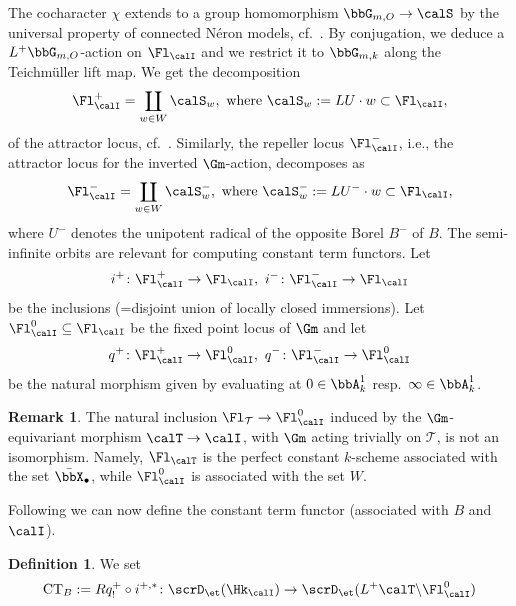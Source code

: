 \documentclass[10pt, reqno]{amsart}
\theoremstyle{plain}
\theoremstyle{definition}
\newtheorem{definition}[theorem]{Definition}
\newtheorem{remark}[theorem]{Remark}
\numberwithin{equation}{section}
\begin{document}
	The cocharacter $\chi$ extends to a group homomorphism $\bbG_{m,O} \to \calS$ by the universal property of connected Néron models, cf.\ \cite[Proposition 8.4]{KP23}. By conjugation, we deduce a $L^+\bbG_{m,O}$-action on $\Fl_{\calI}$ and we restrict it to $\bbG_{m,k}$ along the Teichmüller lift map. We get the decomposition
	\begin{equation}
		\Fl_{\calI}^+=\coprod\limits_{w\in W} \calS_w,\text{ where } \calS_w:=LU\cdot w\subset \Fl_{\calI},
	\end{equation}
	of the attractor locus, cf.\ \cite[Section 5]{AGLR22}. Similarly, the repeller locus $\Fl_{\calI}^-$, i.e., the attractor locus for the inverted $\Gm$-action, decomposes as
	\begin{equation}\label{equation_repellers}
		\Fl_{\calI}^-=\coprod\limits_{w\in W} \calS^-_w,\text{ where } \calS^-_w:=LU^-\cdot w\subset \Fl_{\calI},
	\end{equation}
	where $U^-$ denotes the unipotent radical of the opposite Borel $B^-$ of $B$. The semi-infinite orbits are relevant for computing constant term functors.
	Let
	\begin{equation}
		i^+\colon \Fl_{\calI}^+\to \Fl_{\calI},\ i^-\colon \Fl_{\calI}^-\to \Fl_{\calI}
	\end{equation}
	be the inclusions (=disjoint union of  locally closed immersions).
	Let $\Fl_{\calI}^0\subseteq \Fl_{\calI}$ be the fixed point locus of $\Gm$ and let
	\begin{equation}
		q^+\colon \Fl_{\calI}^+\to \Fl_{\calI}^0,\ q^-\colon \Fl_{\calI}^-\to \Fl_{\calI}^0
	\end{equation}
	be the natural morphism given by evaluating at $0\in \bbA^1_{k}$ resp.\ $\infty\in \bbA^1_{k}$.
	
	\begin{remark}
		\label{sec:constant-terms-semi-fixed-point-locus-not-equal-to-affine-flag-variety-for-levi}
		The natural inclusion $\Fl_{\mathcal{T}}\to \Fl_{\calI}^0$ induced by the $\Gm$-equivariant morphism $\calT\to \calI$, with $\Gm$ acting trivially on $\mathcal{T}$, is not an isomorphism. Namely, $\Fl_{\calT}$ is the perfect constant $k$-scheme associated with the set $\bar{\bbX}_\bullet$, while $\Fl_{\calI}^0$ is associated with the set $W$. 
	\end{remark}
	
	Following \cite[Section 6.3]{AGLR22} we can now define the constant term functor (associated with $B$ and $\calI$).
	
	\begin{definition}
		\label{sec:constant-terms-semi-definition-constant-term}
		We set
		\begin{equation}
			\mathrm{CT}_B:=Rq^+_!\circ i^{+,\ast}\colon \scrD_\et(\Hk_{\calI})\to \scrD_\et(L^+\calT\backslash\Fl_{ \calI}^0)
		\end{equation}
	\end{definition}
	
\end{document}
